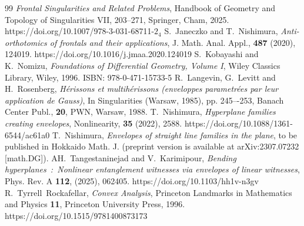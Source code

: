 \documentclass{amsart}
\theoremstyle{definition}
\theoremstyle{definition}
\theoremstyle{definition}
\begin{document}
{\begin{thebibliography}{99}
\emph{Frontal Singularities and Related Problems}, 
Handbook of Geometry and Topology of Singularities VII, 
203--271, Springer, Cham, 2025.   
https://doi.org/10.1007/978-3-031-68711-$2_4$ 
S.~Janeczko and T.~Nishimura,
\emph{Anti-orthotomics of frontals and their applications}, J. Math. Anal. Appl.,
{\bf 487} (2020), 124019.
https://doi.org/10.1016/j.jmaa.2020.124019  
{\color{black} 
S.~Kobayashi and K.~Nomizu, 
\emph{Foundations of Differential Geometry, Volume I}, 
Wiley Classics Library, Wiley, 1996.   
ISBN: 978-0-471-15733-5   
}
R.~Langevin, G.~Levitt and H.~Rosenberg, 
\emph{H\'erissons et multih\'erissons (enveloppes 
parametr\'ees par leur application de Gauss)},   
In Singularities (Warsaw, 1985), pp. 245–-253, 
Banach Center Publ., {\bf 20}, PWN, Warsaw, 1988.     
T.~Nishimura,
\emph{Hyperplane families creating envelopes},
Nonlinearity,  {\bf 35} (2022),  2588.
https://doi.org/10.1088/1361-6544/ac61a0 
T.~Nishimura,
\emph{Envelopes of straight line families in the plane},
to be published in Hokkaido Math. J. 
(preprint version is available at arXiv:2307.07232 [math.DG]).
{\color{black}
AH.~Tangestaninejad and V.~Karimipour, 
\emph{Bending hyperplanes~:~Nonlinear entanglement witnesses 
via envelopes of linear witnesses}, 
Phys. Rev. A {\bf 112}, (2025), 062405.   
https://doi.org/10.1103/hh1v-n3gv
}
{\color{black}
R.~Tyrrell~Rockafellar, 
\emph{Convex Analysis}, 
Princeton Landmarks in Mathematics and Physics {\bf 11}, 
Princeton University Press, 1996.    
https://doi.org/10.1515/9781400873173 
}
\end{thebibliography}}
\end{document}
